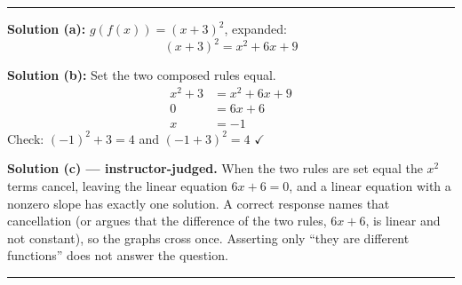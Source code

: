 \documentclass[12pt]{article}
\begin{document}
\vspace{0.2cm}\noindent\rule{\linewidth}{0.2pt}


\textbf{Solution (a):} $g(f(x)) = (x + 3)^2$, expanded:
\[ (x + 3)^2 = x^2 + 6x + 9 \]

\textbf{Solution (b):} Set the two composed rules equal.
\begin{align*}
  x^2 + 3 &= x^2 + 6x + 9 \\
  0 &= 6x + 6 \\
  x &= -1
\end{align*}
Check: $(-1)^2 + 3 = 4$ and $(-1 + 3)^2 = 4$ $\checkmark$ 

\vspace{0.15cm}
\textbf{Solution (c) --- instructor-judged.} When the two rules are set equal the $x^2$
terms cancel, leaving the linear equation $6x + 6 = 0$, and a linear equation with a nonzero
slope has exactly one solution. A correct response names that cancellation (or argues that
the difference of the two rules, $6x + 6$, is linear and not constant), so the graphs cross
once. Asserting only ``they are different functions'' does not answer the question.

\vspace{0.2cm}\noindent\rule{\linewidth}{0.2pt}
\end{document}
